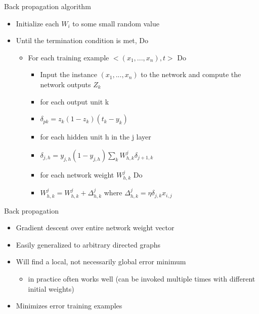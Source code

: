 \begin{frame}{Back propagation algorithm}
    \begin{itemize}
        \item Initialize each $W_i$ to some small random value
        \item Until the termination condition is met, Do
        \begin{itemize}
            \item For each training example $<(x_1, ..., x_n), t>$ Do
            \begin{itemize}
                \item Input the instance $(x_1, ..., x_n)$ to the network and compute the network outputs $Z_k$
                \item for each output unit k
                \item $\delta_{pk} = z_k (1-z_k)(t_k-y_k)$
                \item for each hidden unit h in the j layer
                \item $\delta_{j,h} = y_{j,h} (1-y_{j,h}) \sum_{k}{}W^j_{h,k} \delta_{j+1,k}$
                \item for each network weight $W^j_{h,k}$ Do
                \item $W^j_{h,k} = W^j_{h,k} + \Delta^j_{h,k}$ where
                $\Delta^j_{h,k} = \eta \delta_{j,k} x_{i,j}$
            \end{itemize}
        \end{itemize}
    \end{itemize}
\end{frame}

\begin{frame}{Back propagation}
    \begin{itemize}
        \item Gradient descent over entire network weight vector
        \item Easily generalized to arbitrary directed graphs
        \item Will find a local, not necessarily global error minimum
        \begin{itemize}
            \item in practice often works well (can be invoked multiple
                times with different initial weights)
        \end{itemize}
        \item Minimizes error training examples
        

    \end{itemize}
\end{frame}